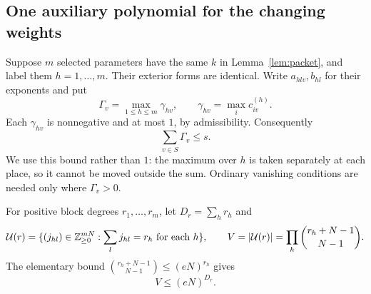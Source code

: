 \documentclass[11pt]{article}
\numberwithin{equation}{section}
\theoremstyle{remark}\newtheorem{remark}[theorem]{Remark}
\begin{document}
\subsection{One auxiliary polynomial for the changing weights}
Suppose $m$ selected parameters have the same $k$ in
Lemma~\ref{lem:packet}, and label them $h=1,\ldots,m$.
Their exterior forms are identical. Write $a_{hlv},b_{hl}$ for their
exponents and put
\begin{equation}\label{eq:Gamma}
 \Gamma_v=\max_{1\le h\le m}\gamma_{hv},\qquad
 \gamma_{hv}=\max_i c^{(h)}_{iv}.
\end{equation}
Each $\gamma_{hv}$ is nonnegative and at most $1$, by admissibility.
Consequently
\begin{equation}\label{eq:Gammasum}
 \sum_{v\in S}\Gamma_v\le s.
\end{equation}
We use this bound rather than $1$: the maximum over $h$ is taken
separately at each place, so it cannot be moved outside the sum.
Ordinary vanishing conditions are needed only where $\Gamma_v>0$.

For positive block degrees $r_1,\ldots,r_m$, let $D_r=\sum_hr_h$ and
\[
 \mathcal U(r)=\{(j_{hl})\in\mathbb Z_{\ge0}^{mN}:\sum_lj_{hl}=r_h
                    \text{ for each }h\},\qquad
 V=|\mathcal U(r)|=\prod_h\binom{r_h+N-1}{N-1}.
\]
The elementary bound $\binom{r_h+N-1}{N-1}\le(eN)^{r_h}$ gives
\begin{equation}\label{eq:monomialcount}
 V\le(eN)^{D_r}.
\end{equation}
\end{document}
